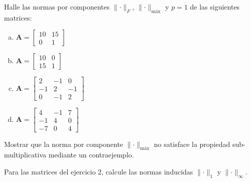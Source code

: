\documentclass[11pt]{article}
\begin{document}
\begin{question} %
    Halle las normas por componentes $\lVert \cdot \rVert_F$, $\lVert \cdot \rVert_{\text{máx}}$ y  $p = 1$ de las siguientes matrices:
    \begin{enumerate}[a)]
        \item $\bm{A} = \begin{bmatrix} 10 & 15 \\ 0 & 1 \end{bmatrix}$
        \item $\bm{A} = \begin{bmatrix}
            10 & 0 \\ 15 & 1 \end{bmatrix}$
        \item $\bm{A} = \begin{bmatrix}
            2 & -1 & 0 \\ -1 & 2 & -1 \\
            0 & -1 & 2\end{bmatrix}$
        \item $\bm{A} = \begin{bmatrix}
            4 & -1 & 7 \\ -1 & 4 & 0 \\
            -7 & 0 & 4\end{bmatrix}$
    \end{enumerate}
\end{question}

\begin{question} %
    Mostrar que la norma por componente $\lVert \cdot \rVert_{\text{máx}}$ no satisface la propiedad sub-multiplicativa mediante un contraejemplo.
\end{question}

\begin{question} %
    Para las matrices del ejercicio 2, calcule las normas inducidas $\lVert \cdot \rVert_{1}$ y  $\lVert \cdot \rVert_{\infty}$.
\end{question}
\end{document}
